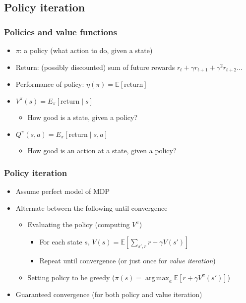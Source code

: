 \documentclass{beamer}
\DeclareMathOperator*{\argmax}{arg\,max}
\begin{document}
\subsection{Policy iteration}

\begin{frame}
  \frametitle{Policies and value functions}
  \begin{itemize}
    \item $\pi$: a policy (what action to do, given a state)
    \item Return: (possibly discounted) sum of future rewards $r_t + \gamma r_{t+1} + \gamma^2 r_{t+2} \ldots$
    \item Performance of policy: $\eta(\pi) = \mathbb{E} [\text{return}]$
    \item $V^\pi(s) = E_\pi[\text{return} \mid s]$
      \begin{itemize}
        \item How good is a state, given a policy?
      \end{itemize}
    \item $Q^\pi(s, a) = E_\pi[\text{return} \mid s, a]$
      \begin{itemize}
        \item How good is an action at a state, given a policy?
      \end{itemize}
  \end{itemize}
\end{frame}


\begin{frame}
  \frametitle{Policy iteration}
  \begin{itemize}
    \item Assume perfect model of MDP
    \item Alternate between the following until convergence
      \begin{itemize}
        \item Evaluating the policy (computing $V^\pi$)
          \begin{itemize}
            \item For each state $s$, $V(s) = \mathbb{E} [\sum_{s', r} r + \gamma V(s')]$
            \item Repeat until convergence (or just once for \textit{value iteration})
          \end{itemize}
        \item Setting policy to be greedy ($\pi(s) = \argmax_a \mathbb{E} [r + \gamma V^\pi (s')]$)
      \end{itemize}
    \item Guaranteed convergence (for both policy and value iteration)
  \end{itemize}
\end{frame}
\end{document}
